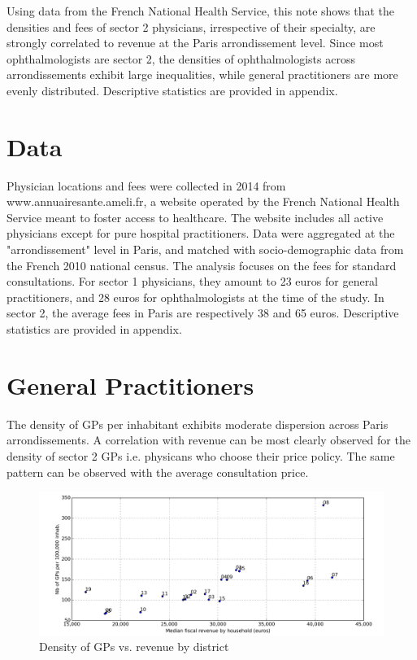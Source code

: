 \documentclass[11pt]{article}
\begin{document}
Using data from the French National Health Service, this note shows that the densities and fees of sector 2 physicians, irrespective of their specialty, are strongly correlated to revenue at the Paris arrondissement level. Since most ophthalmologists are sector 2, the densities of ophthalmologists across arrondissements exhibit large inequalities, while general practitioners are more evenly distributed. Descriptive statistics are provided in appendix.

\section{Data}

Physician locations and fees were collected in 2014 from www.annuairesante.ameli.fr, a website operated by the French National Health Service meant to foster access to healthcare. The website includes all active physicians except for pure hospital practitioners. Data were aggregated at the "arrondissement" level in Paris, and matched with socio-demographic data from the French 2010 national census. The analysis focuses on the fees for standard consultations. For sector 1 physicians, they amount to 23 euros for general practitioners, and 28 euros for ophthalmologists at the time of the study. In sector 2, the average fees in Paris are respectively 38 and 65 euros. Descriptive statistics are provided in appendix.

\section{General Practitioners}

The density of GPs per inhabitant exhibits moderate dispersion across Paris arrondissements. A correlation with revenue can be most clearly observed for the density of sector 2 GPs i.e. physicans who choose their price policy. The same pattern can be observed with the average consultation price.

\begin{figure}[H]
    \caption{Density of GPs vs. revenue by district}
	\centering
		\includegraphics[width=16cm]{images/GP_Ardt_DensityVsRevenue.png}
\end{figure}
\end{document}
